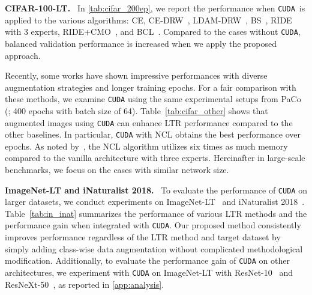 \documentclass{article}
\newcommand{\myparagraph}[1]{\vspace{0.07cm}\noindent\textbf{#1}~}
\def\code#1{\texttt{#1}}
\newcommand{\alg}{\code{CUDA}\xspace}
\renewcommand*\cite[1]{\citep{#1}}
\begin{document}
 
\myparagraph{CIFAR-100-LT.} In \autoref{tab:cifar_200ep}, we report the performance when \alg~is applied to the various algorithms: CE, CE-DRW~\cite{cao2019learning}, LDAM-DRW~\cite{cao2019learning}, BS~\cite{ren2020balanced}, RIDE~\cite{wang2021longtailed} with 3 experts, RIDE+CMO~\cite{park2022majority}, and BCL~\cite{zhu2022balanced}.
Compared to the cases without \alg, balanced validation performance is increased when we apply the proposed approach. 

Recently, some works \cite{cui2021parametric, alshammari2022long, zhu2022balanced, li2022nested} have shown impressive performances with diverse augmentation strategies and longer training epochs. For a fair comparison with these methods, we examine \alg using the same experimental setups from PaCo (\citealt{cui2021parametric}; 400 epochs with batch size of 64). Table~\ref{tab:cifar_other} shows that augmented images using \alg can enhance LTR performance compared to the other baselines. In particular, \alg with NCL obtains the best performance over  epochs. As noted by~\citet{li2022nested}, the NCL algorithm utilizes six times as much memory compared to the vanilla architecture with three experts. Hereinafter in large-scale benchmarks, we focus on the cases with similar network size. 

\myparagraph{ImageNet-LT and iNaturalist 2018.} To evaluate the performance of \alg on larger datasets, we conduct experiments on ImageNet-LT~\cite{liu2019large} and iNaturalist 2018~\cite{van2018inaturalist}. Table~\ref{tab:in_inat} summarizes the performance of various LTR methods and the performance gain when integrated with \alg. Our proposed method consistently improves performance regardless of the LTR method and target dataset by simply adding class-wise data augmentation without complicated methodological modification. Additionally, to evaluate the performance gain of \alg on other architectures, we experiment with \alg on ImageNet-LT with ResNet-10~\cite{liu2019large} and ResNeXt-50~\cite{xie2017aggregated}, as reported in \autoref{app:analysis}.
\end{document}
